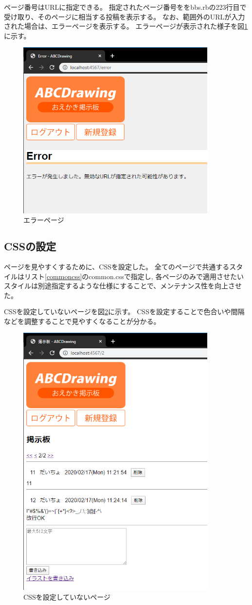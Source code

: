 \documentclass[a4j,titlepage]{jsarticle}
\begin{document}
ページ番号はURLに指定できる。
指定されたページ番号ををbbs.rbの223行目で受け取り、そのページに相当する投稿を表示する。
なお、範囲外のURLが入力された場合は、エラーページを表示する。
エラーページが表示された様子を図\ref{f7}に示す。

\begin{figure}[H]
  \centering
  \includegraphics[width=10cm]{bbs11.png}
  \caption{エラーページ}
  \label{f7}
\end{figure}

\subsection{CSSの設定}
ページを見やすくするために、CSSを設定した。
全てのページで共通するスタイルはリスト\ref{commoncss}のcommon.cssで指定し, 各ページのみで適用させたいスタイルは別途指定するような仕様にすることで、メンテナンス性を向上させた。

CSSを設定していないページを図\ref{f8}に示す。
CSSを設定することで色合いや間隔などを調整することで見やすくなることが分かる。

\begin{figure}[H]
  \centering
  \includegraphics[width=10cm]{bbs12.png}
  \caption{CSSを設定していないページ}
  \label{f8}
\end{figure}
\end{document}

